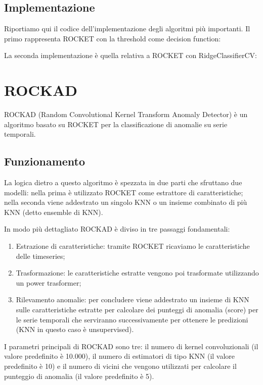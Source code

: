 \pagebreak

\subsection{Implementazione}

Riportiamo qui il codice dell'implementazione degli algoritmi più importanti.
Il primo rappresenta ROCKET con la threshold come decision function:

\pagebreak
La seconda implementazione è quella relativa a ROCKET con RidgeClassifierCV:


\pagebreak
\section{ROCKAD}
ROCKAD (Random Convolutional Kernel Transform Anomaly Detector) è un algoritmo basato su ROCKET per la classificazione di anomalie su serie temporali.
\subsection{Funzionamento}
La logica dietro a questo algoritmo è spezzata in due parti che sfruttano due modelli: nella prima è utilizzato ROCKET come estrattore di caratteristiche; nella seconda viene addestrato un singolo KNN o un insieme combinato di più KNN (detto ensemble di KNN).

In modo più dettagliato ROCKAD è diviso in tre passaggi fondamentali:
\begin{enumerate}
    \item Estrazione di caratteristiche: tramite ROCKET ricaviamo le caratteristiche delle timeseries;
    \item Trasformazione: le caratteristiche estratte vengono poi trasformate utilizzando un power trasformer;
    \item Rilevamento anomalie: per concludere viene addestrato un insieme di KNN sulle caratteristiche estratte per calcolare dei punteggi di anomalia (score) per le serie temporali che serviranno successivamente per ottenere le predizioni (KNN in questo caso è unsupervised).
\end{enumerate}

I parametri principali di ROCKAD sono tre: il numero di kernel convoluzionali (il valore predefinito è 10.000), il numero di estimatori di tipo KNN (il valore predefinito è 10) e il numero di vicini che vengono utilizzati per calcolare il punteggio di anomalia (il valore predefinito è 5).

